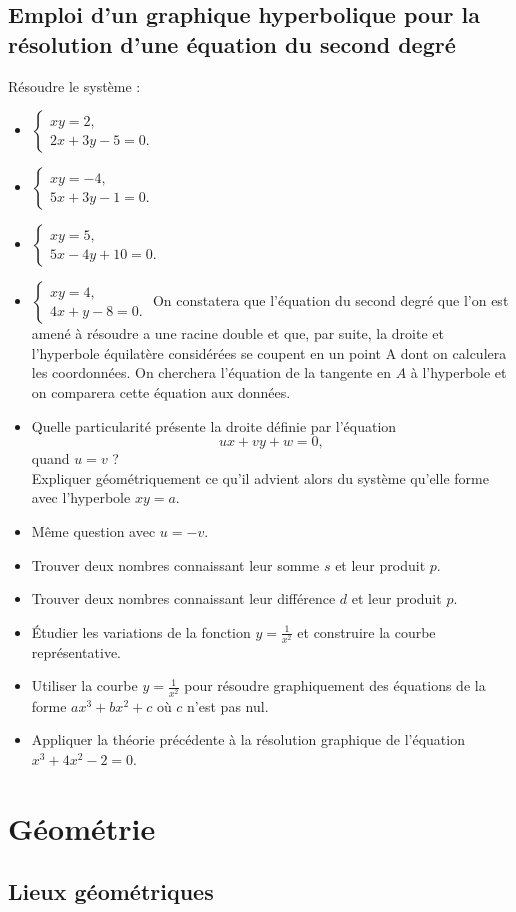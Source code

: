 \documentclass[12 pt]{report}
\theoremstyle{plain}
\newcounter{n}
\renewcommand{\it}{\item[$\mathbf{\then}.$]\stepcounter{n} }
\newenvironment{calcul}{\item[$\mathbf{\then}.$] \stepcounter{n}\hfil $\displaystyle  }{.$\hfil   }
\newcommand\syst[4]{
 \begin{calcul} \left\{ \begin{array}{l} #1 = #2, \\ #3 = #4.\end{array}\right\end{calcul}}
\begin{document}
 \chapter{Emploi d'un graphique hyperbolique pour la résolution d'une équation du second degré}
Résoudre le système : 
\begin{itemize}
 \syst{xy}{2}{2x+3y-5}{0}
 \syst{xy}{-4}{5x+3y-1}{0}
 \syst{xy}{5}{5x-4y+10}{0}
 \syst{xy}{4}{4x+y-8}{0}
 On constatera que l'équation du second degré que l'on est amené à résoudre a une racine double et que, par suite, la droite et l'hyperbole équilatère considérées se coupent en un point A dont on calculera les coordonnées. On cherchera l'équation de la tangente en $A$ à l'hyperbole et on comparera cette équation aux données. 
 \it Quelle particularité présente la droite définie par l'équation \[
 ux+vy+w = 0,\] quand $u=v$ ?\\Expliquer géométriquement ce qu'il advient alors du système qu'elle forme avec l'hyperbole $xy=a$. 
 \it Même question avec $u=-v$. 
 \it Trouver deux nombres connaissant leur somme $s$ et leur produit $p$. 
\it Trouver deux nombres connaissant leur différence $d$ et leur produit $p$.
\it Étudier les variations de la fonction $y=\frac1{x^2}$ et construire la courbe représentative. 
\it Utiliser la courbe $y=\frac1{x^2}$ pour résoudre graphiquement des équations de la forme $ax^3+ bx^2+c$ où $c$ n'est pas nul. 
\it Appliquer la théorie précédente à la résolution graphique de l'équation $x^3+4x^2-2=0$. 
  

\end{itemize}
 \part{Géométrie}
 \chapter{Lieux géométriques}
 
\end{document}
